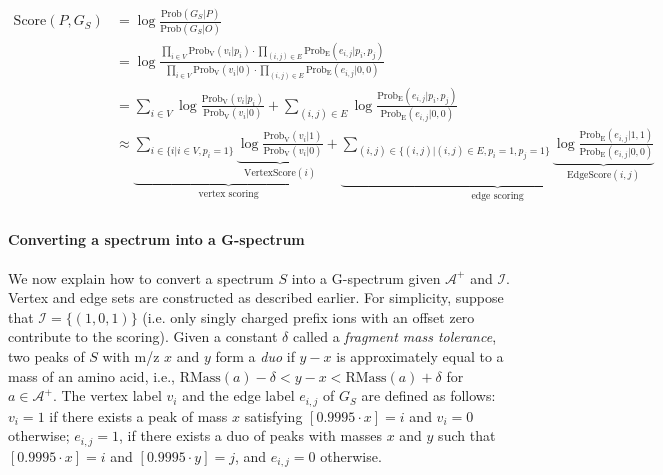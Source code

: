 \begin{equation}
\label{HHEquation}
\begin{split}
\textrm{Score}(P, G_S)
& = \log \frac{\textrm{Prob}(G_S|P)}{\textrm{Prob}(G_S|O)}  \\
& = \log \frac{\prod_{i \in V} \textrm{Prob}_{\textrm{V}}(v_i | p_i) \cdot \prod_{(i,j) \in E} \textrm{Prob}_{\textrm{E}}(e_{i,j} | p_i, p_j)}
{\prod_{i \in V} \textrm{Prob}_{\textrm{V}}(v_i | 0) \cdot \prod_{(i,j) \in E} \textrm{Prob}_{\textrm{E}}(e_{i,j} | 0, 0)} \\
& = \sum_{i \in V} \log \frac{\textrm{Prob}_{\textrm{V}}(v_i | p_i)}{\textrm{Prob}_{\textrm{V}}(v_i | 0)}
+ \sum_{(i,j) \in E} \log \frac{\textrm{Prob}_{\textrm{E}}(e_{i,j} | p_i, p_j)}{\textrm{Prob}_{\textrm{E}}(e_{i,j} | 0,0)} \\
& \approx \underbrace{ \sum_{i \in \{ i | i \in V, p_i = 1\}} \underbrace{ \log \frac{\textrm{Prob}_{\textrm{V}}(v_i | 1)}{\textrm{Prob}_{\textrm{V}}(v_i | 0)}
}_{\text{VertexScore}(i)}
}_{\text{vertex scoring}}
+  \underbrace{ \sum_{(i,j) \in \{ (i,j) | (i,j) \in E, p_i=1, p_j=1\}} \underbrace{ \log \frac{\textrm{Prob}_{\textrm{E}}(e_{i,j} | 1, 1)}{\textrm{Prob}_{\textrm{E}}(e_{i,j} | 0,0)}
}_{\text{EdgeScore}(i,j)} 
}_{\text{edge scoring}} \\
\end{split}
\end{equation}


\paragraph{Converting a spectrum into a G-spectrum}

We now explain how to convert a spectrum $S$ into a G-spectrum given $\mathcal{A}^+$ and $\mathcal{I}$.
Vertex and edge sets are constructed as described earlier.
For simplicity, suppose that $\mathcal{I}=\{(1,0,1)\}$ (i.e. only singly charged prefix ions with an offset zero contribute to the scoring).
Given a constant $\delta$ called a {\em fragment mass tolerance}, two peaks of $S$ with m/z $x$ and $y$ form a {\em duo}
if $y-x$ is approximately equal to a mass of an amino acid, i.e., $\textrm{RMass}(a)-\delta < y-x < \textrm{RMass}(a)+\delta$ for $a \in \mathcal{A}^+$.
The vertex label $v_i$ and the edge label $e_{i,j}$ of $G_S$ are defined as follows:
$v_i=1$ if there exists a peak of mass $x$ satisfying $[0.9995 \cdot x]=i$ and $v_i=0$ otherwise;
$e_{i,j}=1$, if there exists a duo of peaks with masses $x$ and $y$ such that $[0.9995 \cdot x]=i$ and $[0.9995 \cdot y]=j$, and $e_{i,j}=0$ otherwise.


